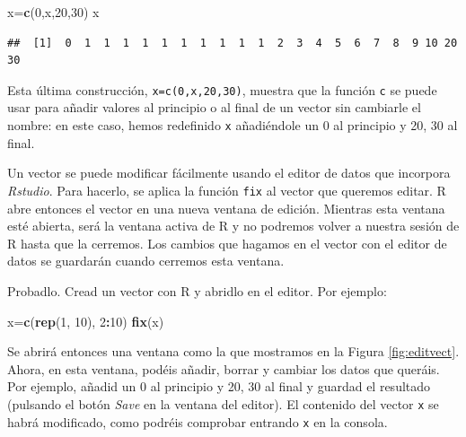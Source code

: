 \documentclass[]{book}
\newenvironment{Shaded}{\begin{snugshade}}{\end{snugshade}}
\newcommand{\DecValTok}[1]{\textcolor[rgb]{0.00,0.00,0.81}{#1}}
\newcommand{\KeywordTok}[1]{\textcolor[rgb]{0.13,0.29,0.53}{\textbf{#1}}}
\newcommand{\NormalTok}[1]{#1}
\newcommand{\OperatorTok}[1]{\textcolor[rgb]{0.81,0.36,0.00}{\textbf{#1}}}
\theoremstyle{definition}
\theoremstyle{definition}
\theoremstyle{definition}
\theoremstyle{remark}
\begin{document}
\begin{Shaded}
\begin{Highlighting}[]
\NormalTok{x=}\KeywordTok{c}\NormalTok{(}\DecValTok{0}\NormalTok{,x,}\DecValTok{20}\NormalTok{,}\DecValTok{30}\NormalTok{)}
\NormalTok{x}
\end{Highlighting}
\end{Shaded}

\begin{verbatim}
##  [1]  0  1  1  1  1  1  1  1  1  1  1  2  3  4  5  6  7  8  9 10 20 30
\end{verbatim}

Esta última construcción, \texttt{x=c(0,x,20,30)}, muestra que la función \texttt{c} se puede usar para añadir valores al principio o al final de un vector sin cambiarle el nombre: en este caso, hemos redefinido \texttt{x} añadiéndole un 0 al principio y 20, 30 al final.

Un vector se puede modificar fácilmente usando el editor de datos que incorpora \emph{Rstudio}. Para hacerlo, se aplica la función \texttt{fix} al vector que queremos editar. R abre entonces el vector en una nueva ventana de edición. Mientras esta ventana esté abierta, será la ventana activa de R y no podremos volver a nuestra sesión de R hasta que la cerremos. Los cambios que hagamos en el vector con el editor de datos se guardarán cuando cerremos esta ventana.

Probadlo. Cread un vector con R y abridlo en el editor. Por ejemplo:

\begin{Shaded}
\begin{Highlighting}[]
\NormalTok{x=}\KeywordTok{c}\NormalTok{(}\KeywordTok{rep}\NormalTok{(}\DecValTok{1}\NormalTok{, }\DecValTok{10}\NormalTok{), }\DecValTok{2}\OperatorTok{:}\DecValTok{10}\NormalTok{)}
\KeywordTok{fix}\NormalTok{(x)}
\end{Highlighting}
\end{Shaded}

Se abrirá entonces una ventana como la que mostramos en la Figura \ref{fig:editvect}. Ahora, en esta ventana, podéis añadir, borrar y cambiar los datos que queráis. Por ejemplo, añadid un 0 al principio y 20, 30 al final y guardad el resultado (pulsando el botón \emph{Save} en la ventana del editor). El contenido del vector \texttt{x} se habrá modificado, como podréis comprobar entrando \texttt{x} en la consola.
\end{document}
